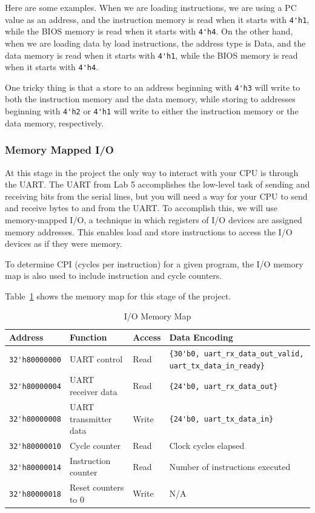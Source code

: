 Here are some examples.
When we are loading instructions, we are using a PC value as an address, and the instruction memory is read when it starts with \verb|4'h1|, while the BIOS memory is read when it starts with \verb|4'h4|.
On the other hand, when we are loading data by load instructions, the address type is Data, and the data memory is read when it starts with \verb|4'h1|, while the BIOS memory is read when it starts with \verb|4'h4|.

One tricky thing is that a store to an address beginning with \verb|4'h3| will write to both the instruction memory and the data memory, while storing to addresses beginning with \verb|4'h2| or \verb|4'h1| will write to either the instruction memory or the data memory, respectively.

\subsubsection{Memory Mapped I/O}
At this stage in the project the only way to interact with your CPU is through the UART.
The UART from Lab 5 accomplishes the low-level task of sending and receiving bits from the serial lines, but you will need a way for your CPU to send and receive bytes to and from the UART.
To accomplish this, we will use memory-mapped I/O, a technique in which registers of I/O devices are assigned memory addresses.
This enables load and store instructions to access the I/O devices as if they were memory.

To determine CPI (cycles per instruction) for a given program, the I/O memory map is also used to include instruction and cycle counters.

Table~\ref{fig:mem_map} shows the memory map for this stage of the project.

\begin{table}[hbt]
  \begin{center}
    \caption{I/O Memory Map}
    \label{fig:mem_map}
    \begin{adjustbox}{width=\columnwidth,center}
    \begin{tabular}{l l l l}
      \toprule
      \textbf{Address} & \textbf{Function} & \textbf{Access} & \textbf{Data Encoding}\\
      \midrule
      \verb|32'h80000000| & UART control & Read & \verb|{30'b0, uart_rx_data_out_valid, uart_tx_data_in_ready}| \\
      \verb|32'h80000004| & UART receiver data & Read & \verb|{24'b0, uart_rx_data_out}| \\
      \verb|32'h80000008| & UART transmitter data & Write & \verb|{24'b0, uart_tx_data_in}| \\
      \midrule
      \verb|32'h80000010| & Cycle counter & Read & Clock cycles elapsed \\
      \verb|32'h80000014| & Instruction counter & Read & Number of instructions executed \\
      \verb|32'h80000018| & Reset counters to 0 & Write & N/A \\
      \bottomrule
    \end{tabular}
    \end{adjustbox}
  \end{center}
\end{table}

